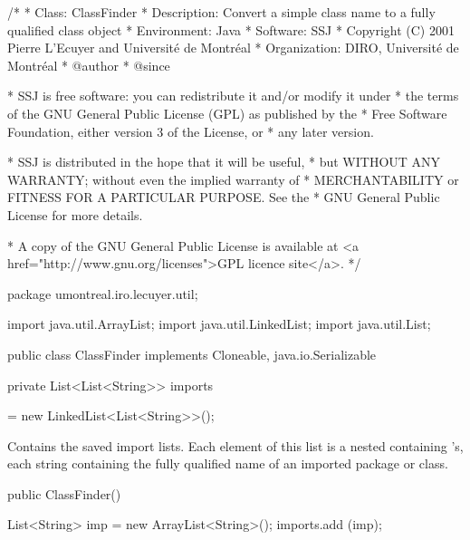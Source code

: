 \begin{code}\begin{hide}
/*
 * Class:        ClassFinder
 * Description:  Convert a simple class name to a fully qualified class object
 * Environment:  Java
 * Software:     SSJ 
 * Copyright (C) 2001  Pierre L'Ecuyer and Université de Montréal
 * Organization: DIRO, Université de Montréal
 * @author       
 * @since

 * SSJ is free software: you can redistribute it and/or modify it under
 * the terms of the GNU General Public License (GPL) as published by the
 * Free Software Foundation, either version 3 of the License, or
 * any later version.

 * SSJ is distributed in the hope that it will be useful,
 * but WITHOUT ANY WARRANTY; without even the implied warranty of
 * MERCHANTABILITY or FITNESS FOR A PARTICULAR PURPOSE.  See the
 * GNU General Public License for more details.

 * A copy of the GNU General Public License is available at
   <a href="http://www.gnu.org/licenses">GPL licence site</a>.
 */
\end{hide}
package umontreal.iro.lecuyer.util;\begin{hide}

import java.util.ArrayList;
import java.util.LinkedList;
import java.util.List;
\end{hide}


public class ClassFinder implements Cloneable, java.io.Serializable\begin{hide} {
   private static final long serialVersionUID = -4847630831331065792L;
\end{hide}

   private List<List<String>> imports\begin{hide} = new LinkedList<List<String>>();
\end{hide}
\end{code}
\begin{tabb}   Contains the saved import lists.
 Each element of this list is a nested  containing
 's, each string containing the fully qualified
 name of an imported package or class.
\end{tabb}
\begin{htmlonly}
\end{htmlonly}
\begin{code}

   public ClassFinder()\begin{hide} {
      List<String> imp = new ArrayList<String>();
      imports.add (imp);
   }\end{hide}
\end{code}
